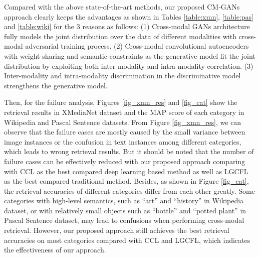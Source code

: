 \documentclass[journal]{IEEEtran}
\begin{document}
Compared with the above state-of-the-art methods, our proposed CM-GANs approach clearly keeps the advantages as shown in Tables \ref{table:xmn}, \ref{table:pas} and \ref{table:wiki} for the 3 reasons as follows: 
(1) Cross-modal GANs architecture fully models the joint distribution over the data of different modalities with cross-modal adversarial training process.
(2) Cross-modal convolutional autoencoders with weight-sharing and semantic constraints as the generative model fit the joint distribution by exploiting both inter-modality and intra-modality correlation.
(3) Inter-modality and intra-modality discrimination in the discriminative model strengthens the generative model.

Then, for the failure analysis, Figures \ref{fig_xmn_res} and \ref{fig_cat} show the retrieval results in XMediaNet dataset and the MAP score of each category in Wikipedia and Pascal Sentence datasets. From Figure \ref{fig_xmn_res}, we can observe that the failure cases are mostly caused by the small variance between image instances or the confusion in text instances among different categories, which leads to wrong retrieval results. But it should be noted that the number of failure cases can be effectively reduced with our proposed approach comparing with CCL as the best compared deep learning based method as well as LGCFL as the best compared traditional method. Besides, as shown in Figure \ref{fig_cat}, the retrieval accuracies of different categories differ from each other greatly. Some categories with high-level semantics, such as ``art'' and ``history'' in Wikipedia dataset, or with relatively small objects such as ``bottle'' and ``potted plant'' in Pascal Sentence dataset, may lead to confusions when performing cross-modal retrieval. However, our proposed approach still achieves the best retrieval accuracies on most categories compared with CCL and LGCFL, which indicates the effectiveness of our approach.
\end{document}
